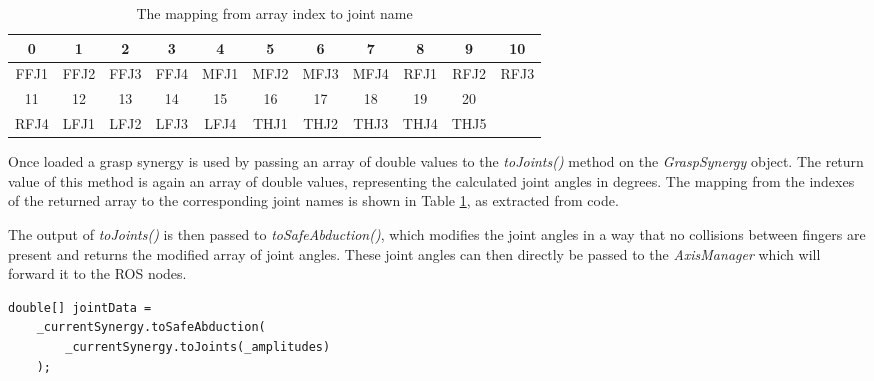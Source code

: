 \begin{table}
	\caption{\label{tab:impl:indexjoints}The mapping from array index to joint name}
	\begin{tabular}{|c|c|c|c|c|c|c|c|c|c|c|}
		\hline
		0 & 1 & 2 & 3 & 4 & 5 & 6 & 7 & 8 & 9 & 10 \\
		\hline
		FFJ1 & FFJ2 & FFJ3 & FFJ4 & MFJ1 & MFJ2 & MFJ3 & MFJ4 & RFJ1 & RFJ2 & RFJ3 \\
		\hline
		\hline
		11 & 12 & 13 & 14 & 15 & 16 & 17 & 18 & 19 & 20 & \\
		\hline
		RFJ4 & LFJ1 & LFJ2 & LFJ3 & LFJ4 & THJ1 & THJ2 & THJ3 & THJ4 & THJ5 & \\
		\hline
	\end{tabular}
\end{table}

Once loaded a grasp synergy is used by passing an array of double values to the \textit{toJoints()} method on the \textit{GraspSynergy} object. The return value of this method is again an array of double values, representing the calculated joint angles in degrees. The mapping from the indexes of the returned array to the corresponding joint names is shown in Table \ref{tab:impl:indexjoints}, as extracted from code.

The output of \textit{toJoints()} is then passed to \textit{toSafeAbduction()}, which modifies the joint angles in a way that no collisions between fingers are present and returns the modified array of joint angles. These joint angles can then directly be passed to the \textit{AxisManager} which will forward it to the ROS nodes.

\begin{lstlisting}[caption={Example call of toJoints() and toSafeAbduction()}]
double[] jointData =
	_currentSynergy.toSafeAbduction(
		_currentSynergy.toJoints(_amplitudes)
	);
\end{lstlisting}

